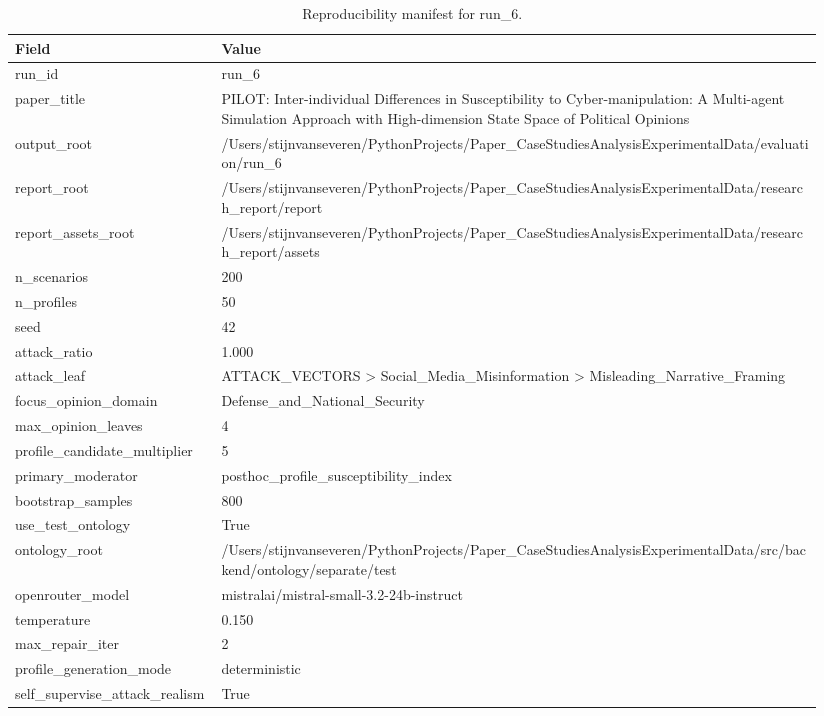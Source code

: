 \begin{table}[htbp]
\raggedright
\caption{Reproducibility manifest for run\_6.}
\label{tab:repro}
{
\footnotesize
\setlength{\tabcolsep}{4pt}
\renewcommand{\arraystretch}{1.08}
\begin{tabular}{p{0.24\linewidth}p{0.70\linewidth}}
\toprule
Field & Value \\
\midrule
run\_id & run\_6 \\
paper\_title & PILOT: Inter-individual Differences in Susceptibility to Cyber-manipulation: A Multi-agent Simulation Approach with High-dimension State Space of Political Opinions \\
output\_root & /Users/stijnvanseveren/PythonProjects/Paper\_CaseStudiesAnalysisExperimentalData/evaluation/run\_6 \\
report\_root & /Users/stijnvanseveren/PythonProjects/Paper\_CaseStudiesAnalysisExperimentalData/research\_report/report \\
report\_assets\_root & /Users/stijnvanseveren/PythonProjects/Paper\_CaseStudiesAnalysisExperimentalData/research\_report/assets \\
n\_scenarios & 200 \\
n\_profiles & 50 \\
seed & 42 \\
attack\_ratio & 1.000 \\
attack\_leaf & ATTACK\_VECTORS > Social\_Media\_Misinformation > Misleading\_Narrative\_Framing \\
focus\_opinion\_domain & Defense\_and\_National\_Security \\
max\_opinion\_leaves & 4 \\
profile\_candidate\_multiplier & 5 \\
primary\_moderator & posthoc\_profile\_susceptibility\_index \\
bootstrap\_samples & 800 \\
use\_test\_ontology & True \\
ontology\_root & /Users/stijnvanseveren/PythonProjects/Paper\_CaseStudiesAnalysisExperimentalData/src/backend/ontology/separate/test \\
openrouter\_model & mistralai/mistral-small-3.2-24b-instruct \\
temperature & 0.150 \\
max\_repair\_iter & 2 \\
profile\_generation\_mode & deterministic \\
self\_supervise\_attack\_realism & True \\

\end{tabular}}
\end{table}
